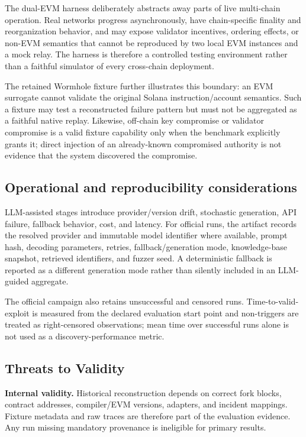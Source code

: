 The dual-EVM harness deliberately abstracts away parts of live multi-chain operation. Real networks progress asynchronously, have chain-specific finality and reorganization behavior, and may expose validator incentives, ordering effects, or non-EVM semantics that cannot be reproduced by two local EVM instances and a mock relay. The harness is therefore a controlled testing environment rather than a faithful simulator of every cross-chain deployment.

The retained Wormhole fixture further illustrates this boundary: an EVM surrogate cannot validate the original Solana instruction/account semantics. Such a fixture may test a reconstructed failure pattern but must not be aggregated as a faithful native replay. Likewise, off-chain key compromise or validator compromise is a valid fixture capability only when the benchmark explicitly grants it; direct injection of an already-known compromised authority is not evidence that the system discovered the compromise.

\subsection{Operational and reproducibility considerations}

LLM-assisted stages introduce provider/version drift, stochastic generation, API failure, fallback behavior, cost, and latency. For official runs, the artifact records the resolved provider and immutable model identifier where available, prompt hash, decoding parameters, retries, fallback/generation mode, knowledge-base snapshot, retrieved identifiers, and fuzzer seed. A deterministic fallback is reported as a different generation mode rather than silently included in an LLM-guided aggregate.

The official campaign also retains unsuccessful and censored runs. Time-to-valid-exploit is measured from the declared evaluation start point and non-triggers are treated as right-censored observations; mean time over successful runs alone is not used as a discovery-performance metric.

\subsection{Threats to Validity}

\textbf{Internal validity.} Historical reconstruction depends on correct fork blocks, contract addresses, compiler/EVM versions, adapters, and incident mappings. Fixture metadata and raw traces are therefore part of the evaluation evidence. Any run missing mandatory provenance is ineligible for primary results.

